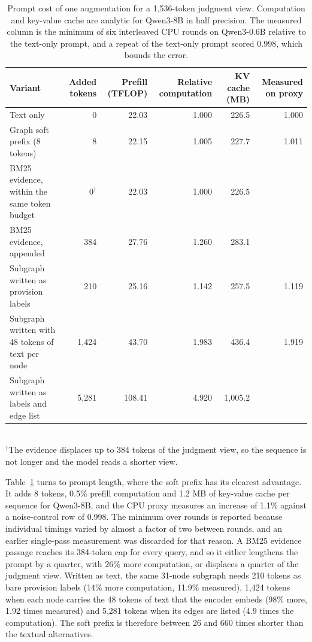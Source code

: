 \documentclass[journal]{IEEEtran}
\begin{document}
\begin{table}[!t]\centering\footnotesize
\setlength{\tabcolsep}{4pt}
\caption{Prompt cost of one augmentation for a 1,536-token judgment view. Computation and key-value cache are analytic for Qwen3-8B in half precision. The measured column is the minimum of six interleaved CPU rounds on Qwen3-0.6B relative to the text-only prompt, and a repeat of the text-only prompt scored 0.998, which bounds the error.}\label{tab:prompt}
\begin{tabular}{@{}lrrrrr@{}}\toprule
Variant & Added tokens & Prefill (TFLOP) & Relative computation & KV cache (MB) & Measured on proxy\\\midrule
Text only & 0 & 22.03 & 1.000 & 226.5 & 1.000\\
Graph soft prefix (8 tokens) & 8 & 22.15 & 1.005 & 227.7 & 1.011\\
BM25 evidence, within the same token budget & 0$^\dagger$ & 22.03 & 1.000 & 226.5 & \\
BM25 evidence, appended & 384 & 27.76 & 1.260 & 283.1 & \\
Subgraph written as provision labels & 210 & 25.16 & 1.142 & 257.5 & 1.119\\
Subgraph written with 48 tokens of text per node & 1,424 & 43.70 & 1.983 & 436.4 & 1.919\\
Subgraph written as labels and edge list & 5,281 & 108.41 & 4.920 & 1,005.2 & \\\bottomrule
\end{tabular}\\[2pt]
{\footnotesize $^\dagger$The evidence displaces up to 384 tokens of the judgment view, so the sequence is not longer and the model reads a shorter view.}
\end{table}

Table~\ref{tab:prompt} turns to prompt length, where the soft prefix has its clearest advantage. It adds 8 tokens, 0.5\% prefill computation and 1.2 MB of key-value cache per sequence for Qwen3-8B, and the CPU proxy measures an increase of 1.1\% against a noise-control row of 0.998. The minimum over rounds is reported because individual timings varied by almost a factor of two between rounds, and an earlier single-pass measurement was discarded for that reason. A BM25 evidence passage reaches its 384-token cap for every query, and so it either lengthens the prompt by a quarter, with 26\% more computation, or displaces a quarter of the judgment view. Written as text, the same 31-node subgraph needs 210 tokens as bare provision labels (14\% more computation, 11.9\% measured), 1,424 tokens when each node carries the 48 tokens of text that the encoder embeds (98\% more, 1.92 times measured) and 5,281 tokens when its edges are listed (4.9 times the computation). The soft prefix is therefore between 26 and 660 times shorter than the textual alternatives.
\end{document}
